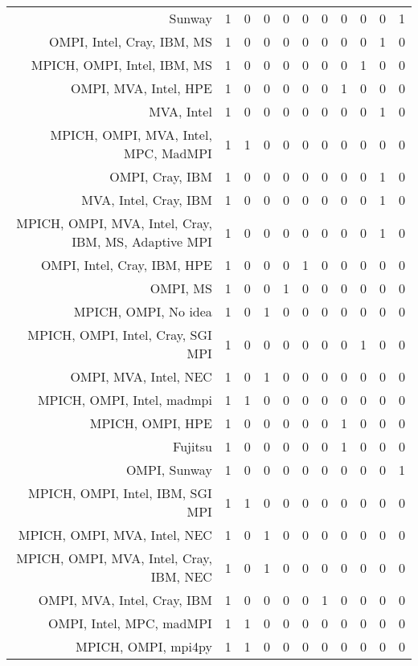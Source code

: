 {\begin{landscape}
\begin{longtable}[htb]{r|c|c|c|c|c|c|c|c|c|c}
{Sunway} & 1 & 0 & 0 & 0 & 0 & 0 & 0 & 0 & 0 & 1 \\%
{OMPI, Intel, Cray, IBM, MS} & 1 & 0 & 0 & 0 & 0 & 0 & 0 & 0 & 1 & 0 \\%
{MPICH, OMPI, Intel, IBM, MS} & 1 & 0 & 0 & 0 & 0 & 0 & 0 & 1 & 0 & 0 \\%
{OMPI, MVA, Intel, HPE} & 1 & 0 & 0 & 0 & 0 & 0 & 1 & 0 & 0 & 0 \\%
{MVA, Intel} & 1 & 0 & 0 & 0 & 0 & 0 & 0 & 0 & 1 & 0 \\%
{MPICH, OMPI, MVA, Intel, MPC, MadMPI} & 1 & 1 & 0 & 0 & 0 & 0 & 0 & 0 & 0 & 0 \\%
{OMPI, Cray, IBM} & 1 & 0 & 0 & 0 & 0 & 0 & 0 & 0 & 1 & 0 \\%
{MVA, Intel, Cray, IBM} & 1 & 0 & 0 & 0 & 0 & 0 & 0 & 0 & 1 & 0 \\%
{MPICH, OMPI, MVA, Intel, Cray, IBM, MS, Adaptive MPI} & 1 & 0 & 0 & 0 & 0 & 0 & 0 & 0 & 1 & 0 \\%
{OMPI, Intel, Cray, IBM, HPE} & 1 & 0 & 0 & 0 & 1 & 0 & 0 & 0 & 0 & 0 \\%
{OMPI, MS} & 1 & 0 & 0 & 1 & 0 & 0 & 0 & 0 & 0 & 0 \\%
{MPICH, OMPI, No idea} & 1 & 0 & 1 & 0 & 0 & 0 & 0 & 0 & 0 & 0 \\%
{MPICH, OMPI, Intel, Cray, SGI MPI} & 1 & 0 & 0 & 0 & 0 & 0 & 0 & 1 & 0 & 0 \\%
{OMPI, MVA, Intel, NEC} & 1 & 0 & 1 & 0 & 0 & 0 & 0 & 0 & 0 & 0 \\%
{MPICH, OMPI, Intel, madmpi} & 1 & 1 & 0 & 0 & 0 & 0 & 0 & 0 & 0 & 0 \\%
{MPICH, OMPI, HPE} & 1 & 0 & 0 & 0 & 0 & 0 & 1 & 0 & 0 & 0 \\%
{Fujitsu} & 1 & 0 & 0 & 0 & 0 & 0 & 1 & 0 & 0 & 0 \\%
{OMPI, Sunway} & 1 & 0 & 0 & 0 & 0 & 0 & 0 & 0 & 0 & 1 \\%
{MPICH, OMPI, Intel, IBM, SGI MPI} & 1 & 1 & 0 & 0 & 0 & 0 & 0 & 0 & 0 & 0 \\%
{MPICH, OMPI, MVA, Intel, NEC} & 1 & 0 & 1 & 0 & 0 & 0 & 0 & 0 & 0 & 0 \\%
{MPICH, OMPI, MVA, Intel, Cray, IBM, NEC} & 1 & 0 & 1 & 0 & 0 & 0 & 0 & 0 & 0 & 0 \\%
{OMPI, MVA, Intel, Cray, IBM} & 1 & 0 & 0 & 0 & 0 & 1 & 0 & 0 & 0 & 0 \\%
{OMPI, Intel, MPC, madMPI} & 1 & 1 & 0 & 0 & 0 & 0 & 0 & 0 & 0 & 0 \\%
{MPICH, OMPI, mpi4py} & 1 & 1 & 0 & 0 & 0 & 0 & 0 & 0 & 0 & 0 \\%

\end{longtable}
\end{landscape}}
